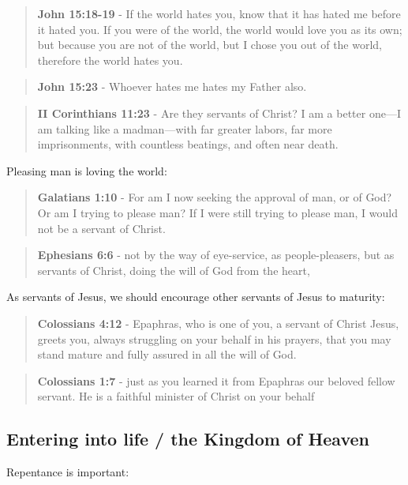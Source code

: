 \documentclass[11pt]{article}
\begin{document}
\begin{quote}
\textbf{John 15:18-19} - If the world hates you, know that it has hated me before it hated you. If you were of the world, the world would love you as its own; but because you are not of the world, but I chose you out of the world, therefore the world hates you.
\end{quote}

\begin{quote}
\textbf{John 15:23} - Whoever hates me hates my Father also.
\end{quote}

\begin{quote}
\textbf{II Corinthians 11:23} - Are they servants of Christ? I am a better one—I am talking like a madman—with far greater labors, far more imprisonments, with countless beatings, and often near death.
\end{quote}

Pleasing man is loving the world:

\begin{quote}
\textbf{Galatians 1:10} - For am I now seeking the approval of man, or of God? Or am I trying to please man? If I were still trying to please man, I would not be a servant of Christ.
\end{quote}

\begin{quote}
\textbf{Ephesians 6:6} - not by the way of eye-service, as people-pleasers, but as servants of Christ, doing the will of God from the heart,
\end{quote}

As servants of Jesus, we should encourage other servants of Jesus to maturity:

\begin{quote}
\textbf{Colossians 4:12} - Epaphras, who is one of you, a servant of Christ Jesus, greets you, always struggling on your behalf in his prayers, that you may stand mature and fully assured in all the will of God.
\end{quote}

\begin{quote}
\textbf{Colossians 1:7} - just as you learned it from Epaphras our beloved fellow servant. He is a faithful minister of Christ on your behalf
\end{quote}

\subsection{Entering into life / the Kingdom of Heaven}
\label{sec:org07e95b3}
Repentance is important:
\end{document}
